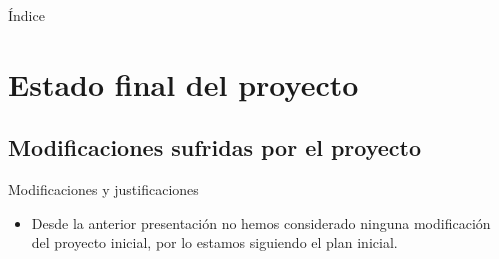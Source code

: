 \documentclass[9pt,xcolor=svgnames]{beamer}
\begin{document}


\begin{frame}
 \titlepage
\end{frame}

\normalsize

\begin{frame}{Índice} 
 \transdissolve
 \tableofcontents
\end{frame}
  
  
 \section{Estado final del proyecto}
 
   
   \subsection{Modificaciones sufridas por el proyecto}
   
   \begin{frame}{Modificaciones y justificaciones}
   \transdissolve
    
    \begin{itemize}
     \item Desde la anterior presentación no hemos considerado
	   ninguna modificación del proyecto inicial, por lo
	   estamos siguiendo el plan inicial.
	 
    \end{itemize}    
    
   \end{frame}
   
\end{document}
